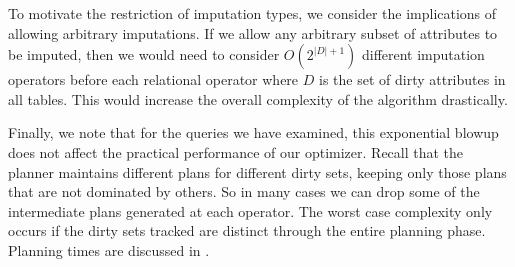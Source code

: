 To motivate the restriction of imputation types, we consider the implications of allowing arbitrary imputations.
If we allow any arbitrary subset of attributes to be imputed, then we would need to consider $O(2^{|D|+1})$ different imputation operators before each relational operator where $D$ is the set of dirty attributes in all tables.
This would increase the overall complexity of the algorithm drastically.

Finally, we note that for the queries we have examined, this exponential blowup does not affect the practical performance of our optimizer.
Recall that the planner maintains different plans for different dirty sets, keeping only those plans that are not dominated by others.
So in many cases we can drop some of the intermediate plans generated at each operator.
The worst case complexity only occurs if the dirty sets tracked are distinct through the entire planning phase.
Planning times are discussed in .

